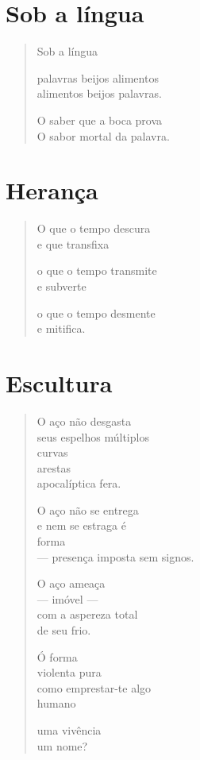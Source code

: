 \chapter{Sob a língua}

\begin{verse}
Sob a língua

palavras beijos alimentos\\
alimentos beijos palavras.

O saber que a boca prova\\
O sabor mortal da palavra.
\end{verse}

\chapter{Herança}

\begin{verse}
O que o tempo descura\\
e que transfixa

o que o tempo transmite\\
e subverte

o que o tempo desmente\\
e mitifica.
\end{verse}

\chapter{Escultura}

\begin{verse}
O aço não desgasta\\
seus espelhos múltiplos\\
curvas\\
arestas\\
apocalíptica fera.

O aço não se entrega\\
e nem se estraga é\\
\qquad\qquad\qquad\qquad\qquad forma\\
--- presença imposta sem signos.

O aço ameaça\\
--- imóvel ---\\
com a aspereza total\\
de seu frio.

Ó forma\\
violenta pura\\
como emprestar-te algo\\
\qquad\qquad\qquad\qquad\qquad humano

uma vivência\\
um nome?
\end{verse}

